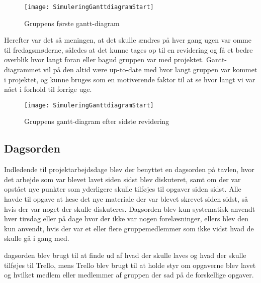 \begin{figure}[h]
\texttt{[image: SimuleringGanttdiagramStart]}
\centering
\caption{Gruppens første gantt-diagram}\label{Gantt-diagram-picture}
\end{figure}

Herefter var det så meningen, at det skulle ændres på hver gang ugen var omme til fredagsmøderne, således at det kunne tages op til en revidering og få et bedre overblik hvor langt foran eller bagud gruppen var med projektet. Gantt-diagrammet vil på den altid være up-to-date med hvor langt gruppen var kommet i projektet, og kunne bruges som en motiverende faktor til at se hvor langt vi var nået i forhold til forrige uge.

\begin{figure}[h]
\texttt{[image: SimuleringGanttdiagramStart]}
\centering
\caption{Gruppens gantt-diagram efter sidste revidering}\label{Gantt-diagram-picture}
\end{figure}

\subsection{Dagsorden}\label{Dagsorden}
Indledende til projektarbejdsdage blev der benyttet en dagsorden på tavlen, hvor det arbejde som var blevet lavet siden sidst blev diskuteret, samt om der var opstået nye punkter som yderligere skulle tilføjes til opgaver siden sidst. Alle havde til opgave at læse det nye materiale der var blevet skrevet siden sidst, så hvis der var noget der skulle diskuteres. Dagsorden blev kun systematisk anvendt hver tirsdag eller på dage hvor der ikke var nogen forelæsninger, ellers blev den kun anvendt, hvis der var et eller flere gruppemedlemmer som ikke vidst hvad de skulle gå i gang med. 

dagsorden blev brugt til at finde ud af hvad der skulle laves og hvad der skulle tilføjes til Trello, mens Trello blev brugt til at holde styr om opgaverne blev lavet og hvilket medlem eller medlemmer af gruppen der sad på de forskellige opgaver.



